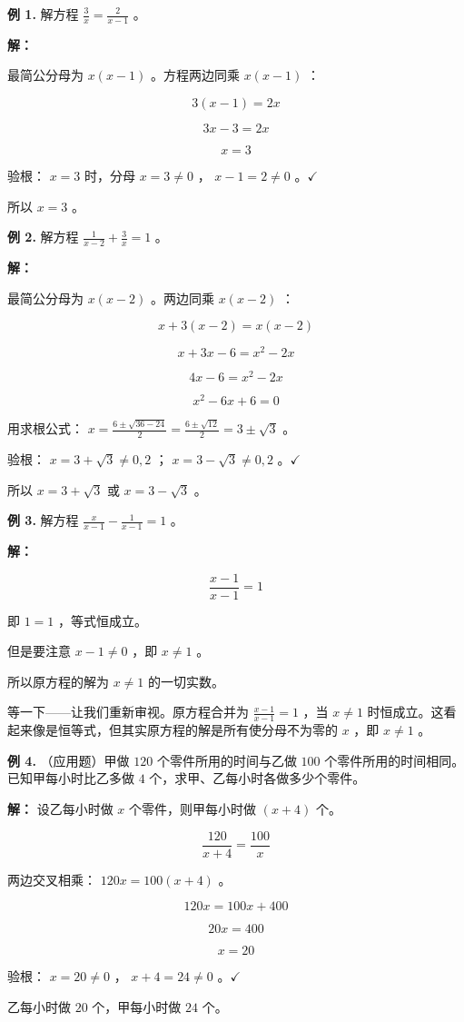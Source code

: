\begin{workedexamples}


\textbf{例 1.} 解方程 $\frac{3}{x} = \frac{2}{x-1}$ 。

\textbf{解：}

最简公分母为 $x(x - 1)$ 。方程两边同乘 $x(x-1)$ ：

\[
3(x - 1) = 2x
\]


\[
3x - 3 = 2x
\]


\[
x = 3
\]


验根： $x = 3$ 时，分母 $x = 3 \neq 0$ ， $x - 1 = 2 \neq 0$ 。$\checkmark$

所以 $x = 3$ 。

\textbf{例 2.} 解方程 $\frac{1}{x-2} + \frac{3}{x} = 1$ 。

\textbf{解：}

最简公分母为 $x(x-2)$ 。两边同乘 $x(x-2)$ ：

\[
x + 3(x - 2) = x(x - 2)
\]


\[
x + 3x - 6 = x^2 - 2x
\]


\[
4x - 6 = x^2 - 2x
\]


\[
x^2 - 6x + 6 = 0
\]


用求根公式： $x = \frac{6 \pm \sqrt{36 - 24}}{2} = \frac{6 \pm \sqrt{12}}{2} = 3 \pm \sqrt{3}$ 。

验根： $x = 3 + \sqrt{3} \neq 0, 2$ ； $x = 3 - \sqrt{3} \neq 0, 2$ 。$\checkmark$

所以 $x = 3 + \sqrt{3}$ 或 $x = 3 - \sqrt{3}$ 。

\textbf{例 3.} 解方程 $\frac{x}{x-1} - \frac{1}{x-1} = 1$ 。

\textbf{解：}

\[
\frac{x - 1}{x - 1} = 1
\]


即 $1 = 1$ ，等式恒成立。

但是要注意 $x - 1 \neq 0$ ，即 $x \neq 1$ 。

所以原方程的解为 $x \neq 1$ 的一切实数。

等一下——让我们重新审视。原方程合并为 $\frac{x-1}{x-1} = 1$ ，当 $x \neq 1$ 时恒成立。这看起来像是恒等式，但其实原方程的解是所有使分母不为零的 $x$ ，即 $x \neq 1$ 。

\textbf{例 4.} （应用题）甲做 $120$ 个零件所用的时间与乙做 $100$ 个零件所用的时间相同。已知甲每小时比乙多做 $4$ 个，求甲、乙每小时各做多少个零件。

\textbf{解：} 设乙每小时做 $x$ 个零件，则甲每小时做 $(x + 4)$ 个。

\[
\frac{120}{x + 4} = \frac{100}{x}
\]


两边交叉相乘： $120x = 100(x + 4)$ 。

\[
120x = 100x + 400
\]


\[
20x = 400
\]


\[
x = 20
\]


验根： $x = 20 \neq 0$ ， $x + 4 = 24 \neq 0$ 。$\checkmark$

乙每小时做 $20$ 个，甲每小时做 $24$ 个。

\end{workedexamples}

